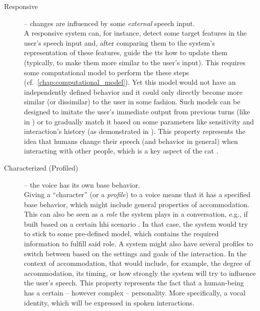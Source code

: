\begin{description}
	\item[Responsive] -- changes are influenced by some \emph{external} speech input.\\
	A responsive system can, for instance, detect some target features in the user's speech input and, after comparing them to the system's representation of these features, guide the \ac{tts} how to update them (typically, to make them more similar to the user's input).
	This requires some computational model to perform the these steps (cf.\ \cref{chap:computational_model}).
	Yet this model would not have an independently defined behavior and it could only directly become more similar (or dissimilar) to the user in some fashion.
	Such models can be designed to imitate the user's immediate output from previous turns (like in \citet{Levitan2016implementing}) or to gradually match it based on some parameters like sensitivity and interaction's history (as demonstrated in \citet{Raveh2017Interspeech}).
	This property represents the idea that humans change their speech (and behavior in general) when interacting with other people, which is a key aspect of the \ac{cat} \citep[][and see \cref{sec:communication_accommodation_theory}]{Giles1991CAT}.
	
	\item[Characterized (Profiled)] -- the voice has its own base behavior.\\
	Giving a \enquote{character} (or a \emph{profile}) to a voice means that it has a specified base behavior, which might include general properties of accommodation.
	This can also be seen as a \emph{role} the system plays in a conversation, e.g., if built based on a certain \ac{hhi} scenario \citep{Silber-Varod2018prosodic}.
	In that case, the system would try to stick to some pre-defined model, which contains the required information to fulfill said role.
	A system might also have several profiles to switch between based on the settings and goals of the interaction.
	In the context of accommodation, that would include, for example, the degree of accommodation, its timing, or how strongly the system will try to influence the user's speech.
	This property represents the fact that a human-being has a certain -- however complex -- personality.
	More specifically, a vocal identity, which will be expressed in spoken interactions.
	

\end{description}
